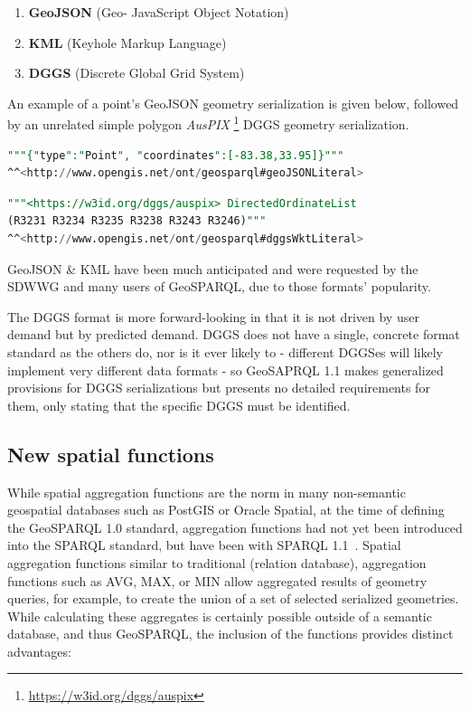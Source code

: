 \documentclass[runningheads]{llncs}
\begin{document}
\begin{enumerate}
    \item \textbf{GeoJSON} (Geo- JavaScript Object Notation)~\cite{butler2016geojson}
    \item \textbf{KML} (Keyhole Markup Language)~\cite{nolan2014keyhole} 
    \item \textbf{DGGS} (Discrete Global Grid System)~\cite{sahr1998discrete}
\end{enumerate} 

An example of a point's GeoJSON geometry serialization is given below, followed by an unrelated simple polygon \textit{AusPIX}
\footnote{\url{https://w3id.org/dggs/auspix}} DGGS geometry serialization.

\small
\begin{lstlisting}[caption=GeoJSON geometry serialization example,label=lst:geojsonliteral,language=sql,frame=single,basicstyle=\ttfamily,showstringspaces=false]
"""{"type":"Point", "coordinates":[-83.38,33.95]}"""
^^<http://www.opengis.net/ont/geosparql#geoJSONLiteral>
\end{lstlisting}

\begin{lstlisting}[caption=AusPIX DGGS geometry serialization example,label=lst:geodggsWktliteral,language=sql,frame=single,basicstyle=\ttfamily,showstringspaces=false]
"""<https://w3id.org/dggs/auspix> DirectedOrdinateList 
(R3231 R3234 R3235 R3238 R3243 R3246)"""
^^<http://www.opengis.net/ont/geosparql#dggsWktLiteral>
\end{lstlisting}
\normalsize

GeoJSON \& KML have been much anticipated and were requested by the SDWWG and many users of 
GeoSPARQL, due to those formats' popularity.

The DGGS format is more forward-looking in that it is not driven by user demand but by predicted demand.
DGGS does not have a single, concrete format standard as the others do, nor is it ever likely to - different DGGSes will 
likely implement very different data formats - so GeoSAPRQL 1.1 makes generalized provisions for DGGS serializations but 
presents no detailed requirements for them, only stating that the specific DGGS must be identified.

\subsection{New spatial functions}\label{sec:newfunctions}
While spatial aggregation functions are the norm in many non-semantic geospatial databases such as PostGIS or Oracle Spatial, 
at the time of defining the GeoSPARQL 1.0 standard, aggregation functions had not yet been introduced into the SPARQL standard,
but have been with SPARQL 1.1~\cite{w3c_sparql_working_group_sparql_2013}. Spatial aggregation functions 
similar to traditional (relation database), aggregation functions such as AVG, MAX, or MIN allow aggregated results of geometry 
queries, for example, to create the union of a set of selected serialized geometries. While calculating these aggregates is 
certainly possible outside of a semantic database, and thus GeoSPARQL, the inclusion of the functions provides distinct advantages:
\end{document}
